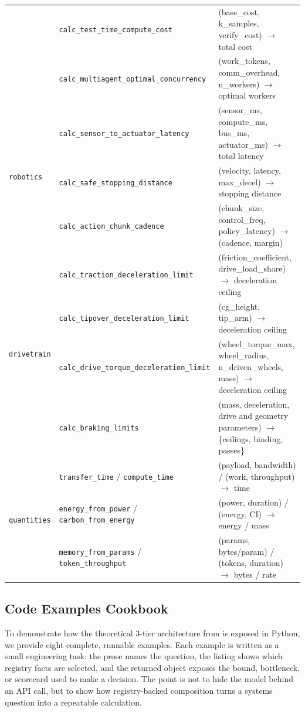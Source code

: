 \documentclass[10pt,twocolumn]{article}
\begin{document}
\begin{appendices}
\begin{table}[!t]
\begin{tabularx}{\textwidth}{@{}l l X@{}}
 & \texttt{calc\_test\_time\_compute\_cost} & (base\_cost, k\_samples, verify\_cost) $\to$ total cost \\
 & \texttt{calc\_multiagent\_optimal\_concurrency} & (work\_tokens, comm\_overhead, n\_workers) $\to$ optimal workers \\
\midrule
\multirow{3}{*}{\texttt{robotics}} & \texttt{calc\_sensor\_to\_actuator\_latency} & (sensor\_ms, compute\_ms, bus\_ms, actuator\_ms) $\to$ total latency \\
 & \texttt{calc\_safe\_stopping\_distance} & (velocity, latency, max\_decel) $\to$ stopping distance \\
 & \texttt{calc\_action\_chunk\_cadence} & (chunk\_size, control\_freq, policy\_latency) $\to$ (cadence, margin) \\
\midrule
\multirow{4}{*}{\texttt{drivetrain}} & \texttt{calc\_traction\_deceleration\_limit} & (friction\_coefficient, drive\_load\_share) $\to$ deceleration ceiling \\
 & \texttt{calc\_tipover\_deceleration\_limit} & (cg\_height, tip\_arm) $\to$ deceleration ceiling \\
 & \texttt{calc\_drive\_torque\_deceleration\_limit} & (wheel\_torque\_max, wheel\_radius, n\_driven\_wheels, mass) $\to$ deceleration ceiling \\
 & \texttt{calc\_braking\_limits} & (mass, deceleration, drive and geometry parameters) $\to$ \{ceilings, binding, passes\} \\
\midrule
\multirow{3}{*}{\texttt{quantities}} & \texttt{transfer\_time} / \texttt{compute\_time} & (payload, bandwidth) / (work, throughput) $\to$ time \\
 & \texttt{energy\_from\_power} / \texttt{carbon\_from\_energy} & (power, duration) / (energy, CI) $\to$ energy / mass \\
 & \texttt{memory\_from\_params} / \texttt{token\_throughput} & (params, bytes/param) / (tokens, duration) $\to$ bytes / rate \\
\bottomrule
\end{tabularx}
\end{table}

\FloatBarrier
\subsection{Code Examples Cookbook}

To demonstrate how the theoretical 3-tier architecture from  is exposed in Python, we provide eight complete, runnable examples. Each example is written as a small engineering task: the prose names the question, the listing shows which registry facts are selected, and the returned object exposes the bound, bottleneck, or scorecard used to make a decision. The point is not to hide the model behind an API call, but to show how registry-backed composition turns a systems question into a repeatable calculation.


\end{appendices}
\end{document}
